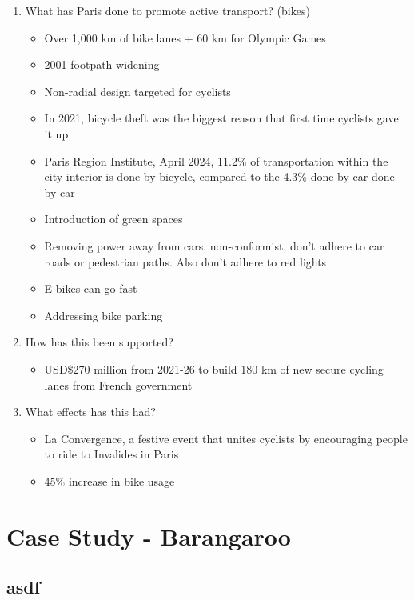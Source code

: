 	\begin{enumerate}
		\item What has Paris done to promote active transport? (bikes)
			\begin{itemize}
				\item Over 1,000 km of bike lanes + 60 km for Olympic Games
				\item 2001 footpath widening
				\item Non-radial design targeted for cyclists
				\item In 2021, bicycle theft was the biggest reason that first time cyclists gave it up
				\item Paris Region Institute, April 2024, 11.2\% of transportation within the city interior is done by bicycle, compared to the 4.3\% done by car done by car
				\item Introduction of green spaces
				\item Removing power away from cars, non-conformist, don't adhere to car roads or pedestrian paths. Also don't adhere to red lights
				\item E-bikes can go fast
				\item Addressing bike parking
			\end{itemize}

		\item How has this been supported?
			\begin{itemize}
				\item USD\$270 million from 2021-26 to build 180 km of new secure cycling lanes from French government
			\end{itemize}

		\item What effects has this had?
			\begin{itemize}
				\item La Convergence, a festive event that unites cyclists by encouraging people to ride to Invalides in Paris
				\item 45\% increase in bike usage
			\end{itemize}
	\end{enumerate}

\section{Case Study - Barangaroo}

	\subsection{asdf}

